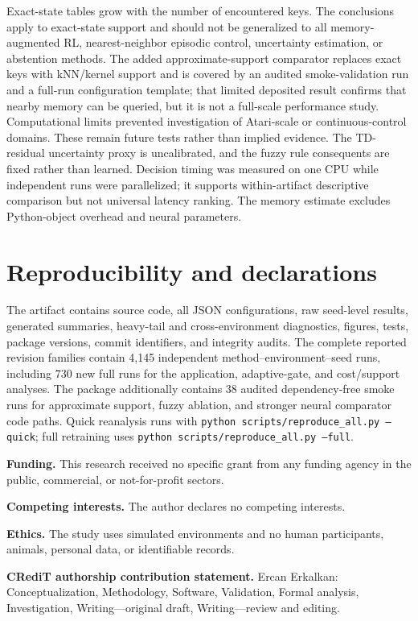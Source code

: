 \documentclass[preprint,12pt]{elsarticle}
\begin{document}
Exact-state tables grow with the number of encountered keys. The conclusions
apply to exact-state support and should not be generalized to all
memory-augmented RL, nearest-neighbor episodic control, uncertainty estimation,
or abstention methods. The added approximate-support comparator replaces exact
keys with kNN/kernel support and is covered by an audited smoke-validation run
and a full-run configuration template; that limited deposited result confirms
that nearby memory can be queried, but it is not a full-scale performance
study. Computational limits prevented investigation of
Atari-scale or continuous-control domains. These remain future tests rather
than implied evidence.
The TD-residual uncertainty proxy is uncalibrated, and the fuzzy rule
consequents are fixed rather than learned. Decision timing was measured on one
CPU while independent runs were parallelized; it supports within-artifact
descriptive comparison but not universal latency ranking. The memory estimate
excludes Python-object overhead and neural parameters.

\section{Reproducibility and declarations}
\label{sec:declarations}

The artifact contains source code, all JSON configurations, raw seed-level
results, generated summaries, heavy-tail and cross-environment diagnostics,
figures, tests, package versions, commit identifiers, and integrity audits.
The complete reported revision families contain 4,145 independent
method--environment--seed runs, including 730 new full runs for the
application, adaptive-gate, and cost/support analyses. The package additionally
contains 38 audited dependency-free smoke runs for approximate support, fuzzy
ablation, and stronger neural comparator code paths. Quick reanalysis runs with
\texttt{python scripts/reproduce\_all.py --quick}; full retraining uses
\texttt{python scripts/reproduce\_all.py --full}.

\textbf{Funding.} This research received no specific grant from any funding
agency in the public, commercial, or not-for-profit sectors.

\textbf{Competing interests.} The author declares no competing interests.

\textbf{Ethics.} The study uses simulated environments and no human
participants, animals, personal data, or identifiable records.

\textbf{CRediT authorship contribution statement.} Ercan Erkalkan:
Conceptualization, Methodology, Software, Validation, Formal analysis,
Investigation, Writing---original draft, Writing---review and editing.
\end{document}
